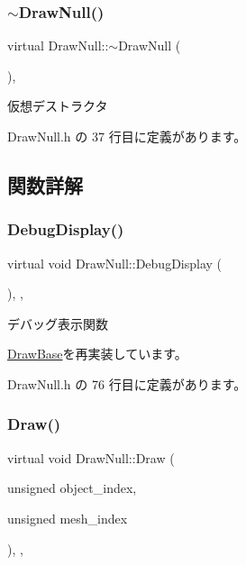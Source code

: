 \subsubsection{\texorpdfstring{$\sim$\+Draw\+Null()}{~DrawNull()}}
{\footnotesize\ttfamily virtual Draw\+Null\+::$\sim$\+Draw\+Null (\begin{DoxyParamCaption}{ }\end{DoxyParamCaption})\hspace{0.3cm}{\ttfamily [inline]}, {\ttfamily [virtual]}}



仮想デストラクタ 



 Draw\+Null.\+h の 37 行目に定義があります。



\subsection{関数詳解}
\mbox{\label{class_draw_null_aa78d05c51ff3943888678b9b2c6bd027}} 
\subsubsection{\texorpdfstring{Debug\+Display()}{DebugDisplay()}}
{\footnotesize\ttfamily virtual void Draw\+Null\+::\+Debug\+Display (\begin{DoxyParamCaption}{ }\end{DoxyParamCaption})\hspace{0.3cm}{\ttfamily [inline]}, {\ttfamily [override]}, {\ttfamily [virtual]}}



デバッグ表示関数 



\mbox{\hyperlink{class_draw_base_a2ba175f791ee01508ffb2be24c68fe7f}{Draw\+Base}}を再実装しています。



 Draw\+Null.\+h の 76 行目に定義があります。

\mbox{\label{class_draw_null_afe50f6fd820b18d673f70f048743f339}} 
\subsubsection{\texorpdfstring{Draw()}{Draw()}}
{\footnotesize\ttfamily virtual void Draw\+Null\+::\+Draw (\begin{DoxyParamCaption}\item[{unsigned}]{object\+\_\+index,  }\item[{unsigned}]{mesh\+\_\+index }\end{DoxyParamCaption})\hspace{0.3cm}{\ttfamily [inline]}, {\ttfamily [override]}, {\ttfamily [virtual]}}



